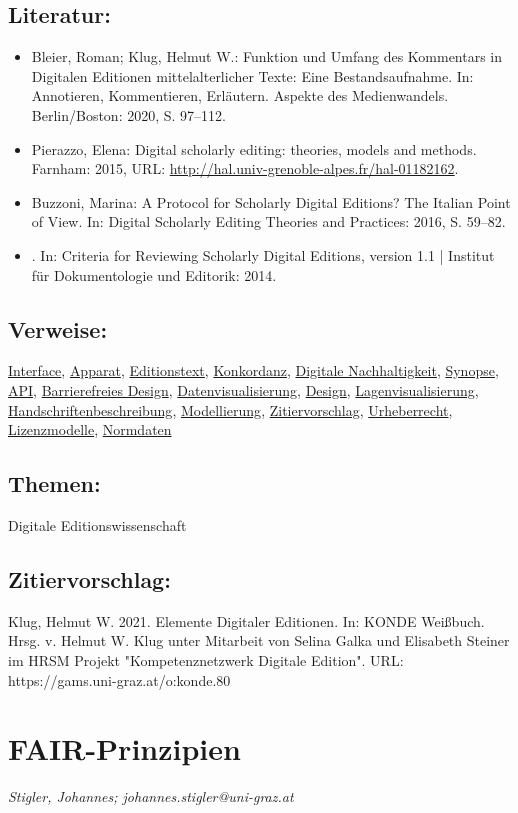 \documentclass{article}
\begin{document}
        \subsection*{Literatur:}\begin{itemize}\item Bleier, Roman; Klug, Helmut W.: Funktion und Umfang des Kommentars in Digitalen Editionen mittelalterlicher Texte: Eine Bestandsaufnahme. In: Annotieren, Kommentieren, Erläutern. Aspekte des Medienwandels. Berlin/Boston: 2020, S. 97–112.\item Pierazzo, Elena: Digital scholarly editing: theories, models and methods. Farnham: 2015, URL: \url{http://hal.univ-grenoble-alpes.fr/hal-01182162}.\item Buzzoni, Marina: A Protocol for Scholarly Digital Editions? The Italian Point of View. In: Digital Scholarly Editing Theories and Practices: 2016, S. 59–82.\item . In: Criteria for Reviewing Scholarly Digital Editions, version 1.1 | Institut für Dokumentologie und Editorik: 2014.\end{itemize}\subsection*{Verweise:}\href{https://gams.uni-graz.at/o:konde.98}{Interface}, \href{https://gams.uni-graz.at/o:konde.32}{Apparat}, \href{https://gams.uni-graz.at/o:konde.75}{Editionstext}, \href{https://gams.uni-graz.at/o:konde.106}{Konkordanz}, \href{https://gams.uni-graz.at/o:konde.6}{Digitale Nachhaltigkeit}, \href{https://gams.uni-graz.at/o:konde.174}{Synopse}, \href{https://gams.uni-graz.at/o:konde.31}{API}, \href{https://gams.uni-graz.at/o:konde.35}{Barrierefreies Design}, \href{https://gams.uni-graz.at/o:konde.54}{Datenvisualisierung}, \href{https://gams.uni-graz.at/o:konde.56}{Design}, \href{https://gams.uni-graz.at/o:konde.113}{Lagenvisualisierung}, \href{https://gams.uni-graz.at/o:konde.92}{Handschriftenbeschreibung}, \href{https://gams.uni-graz.at/o:konde.137}{Modellierung}, \href{https://gams.uni-graz.at/o:konde.220}{Zitiervorschlag}, \href{https://gams.uni-graz.at/o:konde.44}{Urheberrecht}, \href{https://gams.uni-graz.at/o:konde.9}{Lizenzmodelle}, \href{https://gams.uni-graz.at/o:konde.147}{Normdaten}\subsection*{Themen:}Digitale Editionswissenschaft\subsection*{Zitiervorschlag:}Klug, Helmut W. 2021. Elemente Digitaler Editionen. In: KONDE Weißbuch. Hrsg. v. Helmut W. Klug unter Mitarbeit von Selina Galka und Elisabeth Steiner im HRSM Projekt "Kompetenznetzwerk Digitale Edition". URL: https://gams.uni-graz.at/o:konde.80\newpage\section*{FAIR-Prinzipien} \emph{Stigler, Johannes; johannes.stigler@uni-graz.at 	 			}\\
        
\end{document}
